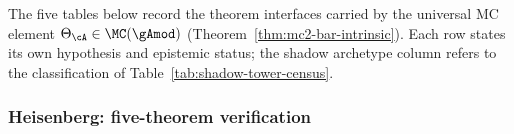 \begin{remark}
\label{rem:free-field-five-theorems}
The five tables below record the theorem interfaces carried by the
universal MC element
$\Theta_\cA \in \MC(\gAmod)$
(Theorem~\ref{thm:mc2-bar-intrinsic}). Each row states its own
hypothesis and epistemic status; the shadow archetype column
refers to the classification of
Table~\ref{tab:shadow-tower-census}.
\end{remark}

\subsubsection{Heisenberg: five-theorem verification}

